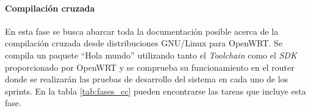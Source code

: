 \documentclass[12pt, twoside]{article}
\begin{document}
        \begin{table}[!htbp]             
            \centering                  
            \caption{Descripción de la face Boceto}
            \label{tab:fases_boc}
        \end{table}
        
        \paragraph{ Compilación cruzada}
        En esta fase se busca abarcar toda la documentación posible acerca de la compilación cruzada desde distribuciones GNU/Linux para OpenWRT. Se compila un paquete ``Hola mundo'' utilizando tanto el \textit{Toolchain} como el \textit{SDK} proporcionado por OpenWRT \cite{SDK} y se comprueba su funcionamiento en el router donde se realizarán las pruebas de desarrollo del sistema en cada uno de los sprints. En la tabla \ref{tab:fases_cc} pueden encontrarse las tareas que incluye esta fase.
\end{document}
